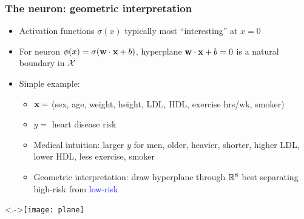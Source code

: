 \begin{frame}
    \frametitle{The neuron: geometric interpretation}
    \begin{itemize}[<.->]
        \item<+-> Activation functions $\sigma(x)$ typically most ``interesting'' at $x = 0$
        \item For neuron $\phi(x) = \sigma(\mathbf{w} \cdot \mathbf{x} + b)$, \textcolor{Green4}{hyperplane} $\mathbf{w} \cdot \mathbf{x} + b = 0$ is a natural boundary in $\mathcal{X}$
        \item<+-> Simple example:
        \begin{itemize}
            \item $\mathbf{x} =$ (sex, age, weight, height, LDL, HDL, exercise hrs/wk, smoker)
            \item $y =$ heart disease risk
            \item<+-> Medical intuition: larger $y$ for men, older, heavier, shorter, higher LDL, lower HDL, less exercise, smoker
            \item Geometric interpretation: draw \textcolor{Green4}{hyperplane} through $\mathbb{R}^8$ best separating \alert{high-risk} from \textcolor{blue}{low-risk}
        \end{itemize}
    \end{itemize}

    \centering
    \visible<.->{\texttt{[image: plane]}}
\end{frame}

